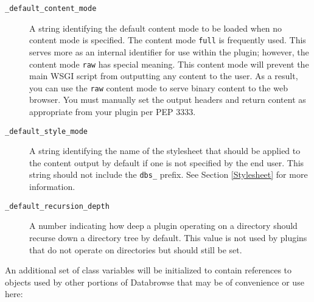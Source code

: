 \documentclass[10pt]{article}
\begin{document}
\begin{description}
	\item[\texttt{\_default\_content\_mode}] A string identifying the default content mode to be loaded when no content mode is specified.  The content mode \texttt{full} is frequently used.  This serves more as an internal identifier for use within the plugin; however, the content mode \texttt{raw} has special meaning.  This content mode will prevent the main WSGI script from outputting any content to the user.  As a result, you can use the \texttt{raw} content mode to serve binary content to the web browser.  You must manually set the output headers and return content as appropriate from your plugin per PEP 3333.
	\item[\texttt{\_default\_style\_mode}] A string identifying the name of the stylesheet that should be applied to the content output by default if one is not specified by the end user.  This string should not include the \texttt{dbs\_} prefix.  See Section \ref{Stylesheet} for more information.
	\item[\texttt{\_default\_recursion\_depth}] A number indicating how deep a plugin operating on a directory should recurse down a directory tree by default.  This value is not used by plugins that do not operate on directories but should still be set.
\end{description}

An additional set of class variables will be initialized to contain references to objects used by other portions of Databrowse that may be of convenience or use here:
\end{document}
